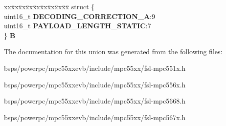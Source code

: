 \begin{DoxyCompactItemize}
\begin{tabbing}
\end{tabbing}\item 
\mbox{\label{unionuPCR19_a86d2da5e2ff4d14b7d9234b21feddde7}} 
\begin{tabbing}
xx\=xx\=xx\=xx\=xx\=xx\=xx\=xx\=xx\=\kill
struct \{\\
\>uint16\_t {\bfseries DECODING\_CORRECTION\_A}:9\\
\>uint16\_t {\bfseries PAYLOAD\_LENGTH\_STATIC}:7\\
\} {\bfseries B}\\

\end{tabbing}\end{DoxyCompactItemize}


The documentation for this union was generated from the following files\+:\begin{DoxyCompactItemize}
\item 
bsps/powerpc/mpc55xxevb/include/mpc55xx/fsl-\/mpc551x.\+h\item 
bsps/powerpc/mpc55xxevb/include/mpc55xx/fsl-\/mpc556x.\+h\item 
bsps/powerpc/mpc55xxevb/include/mpc55xx/fsl-\/mpc5668.\+h\item 
bsps/powerpc/mpc55xxevb/include/mpc55xx/fsl-\/mpc567x.\+h\end{DoxyCompactItemize}
